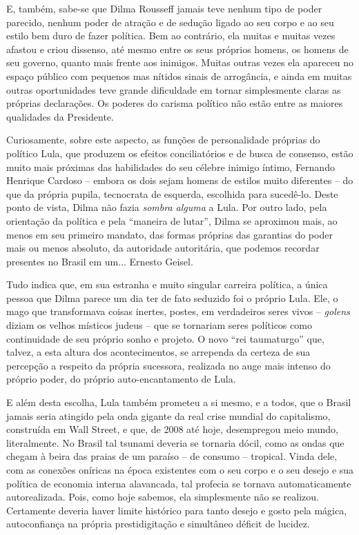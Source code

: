 E, também, sabe-se que Dilma Rousseff jamais teve nenhum tipo de poder
parecido, nenhum poder de atração e de sedução ligado ao seu corpo e ao
seu estilo bem duro de fazer política. Bem ao contrário, ela muitas e
muitas vezes afastou e criou dissenso, até mesmo entre os seus próprios
homens, os homens de seu governo, quanto mais frente aos inimigos.
Muitas outras vezes ela apareceu no espaço público com pequenos mas
nítidos sinais de arrogância, e ainda em muitas outras oportunidades
teve grande dificuldade em tornar simplesmente claras as próprias
declarações. Os poderes do carisma político não estão entre as maiores
qualidades da Presidente.

Curiosamente, sobre este aspecto, as funções de personalidade próprias
do político Lula, que produzem os efeitos conciliatórios e de busca de
consenso, estão muito mais próximas das habilidades do seu célebre
inimigo íntimo, Fernando Henrique Cardoso -- embora os dois sejam homens
de estilos muito diferentes -- do que da própria pupila, tecnocrata de
esquerda, escolhida para sucedê-lo. Deste ponto de vista, Dilma não
fazia \emph{sombra alguma} a Lula. Por outro lado, pela orientação da
política e pela ``maneira de lutar'', Dilma se aproximou mais, ao menos
em seu primeiro mandato, das formas próprias das garantias do poder mais
ou menos absoluto, da autoridade autoritária, que podemos recordar
presentes no Brasil em um... Ernesto Geisel.

Tudo indica que, em sua estranha e muito singular carreira política, a
única pessoa que Dilma parece um dia ter de fato seduzido foi o próprio
Lula. Ele, o mago que transformava coisas inertes, postes, em
verdadeiros seres vivos -- \emph{golens} diziam os velhos místicos
judeus -- que se tornariam seres políticos como continuidade de seu
próprio sonho e projeto. O novo ``rei taumaturgo'' que, talvez, a esta
altura dos acontecimentos, se arrependa da certeza de sua percepção a
respeito da própria sucessora, realizada no auge mais intenso do próprio
poder, do próprio auto-encantamento de Lula.

E além desta escolha, Lula também prometeu a si mesmo, e a todos, que o
Brasil jamais seria atingido pela onda gigante da real crise mundial do
capitalismo, construída em Wall Street, e que, de 2008 até hoje,
desempregou meio mundo, literalmente. No Brasil tal tsunami deveria se
tornaria dócil, como as ondas que chegam à beira das praias de um
paraíso -- de consumo -- tropical. Vinda dele, com as conexões oníricas
na época existentes com o seu corpo e o seu desejo e sua política de
economia interna alavancada, tal profecia se tornava automaticamente
autorealizada. Pois, como hoje sabemos, ela simplesmente não se
realizou. Certamente deveria haver limite histórico para tanto desejo e
gosto pela mágica, autoconfiança na própria prestidigitação e simultâneo
déficit de lucidez.

